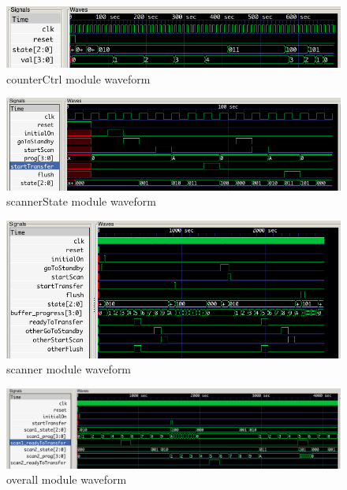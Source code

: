 \documentclass{article}
\begin{document}
      \begin{figure}[H]
        \centering
        \includegraphics[width=0.75\linewidth]{figures/gtkwave/counterCtrl_gtkwave.png}
        \caption{counterCtrl module waveform}
        \label{fig:counterCtrl_gtkwave}
      \end{figure}

      \begin{figure}[H]
        \centering
        \includegraphics[width=0.75\linewidth]{figures/gtkwave/scannerState_gtkwave.png}
        \caption{scannerState module waveform}
        \label{fig:scannerState_gtkwave}
      \end{figure}

      \begin{figure}[H]
        \centering
        \includegraphics[width=0.75\linewidth]{figures/gtkwave/scanner_gtkwave.png}
        \caption{scanner module waveform}
        \label{fig:scanner_gtkwave}
      \end{figure}

      \begin{figure}[H]
        \centering
        \includegraphics[width=0.75\linewidth]{figures/gtkwave/overall_gtkwave.png}
        \caption{overall module waveform}
        \label{fig:overall_gtkwave}
      \end{figure}
\end{document}
